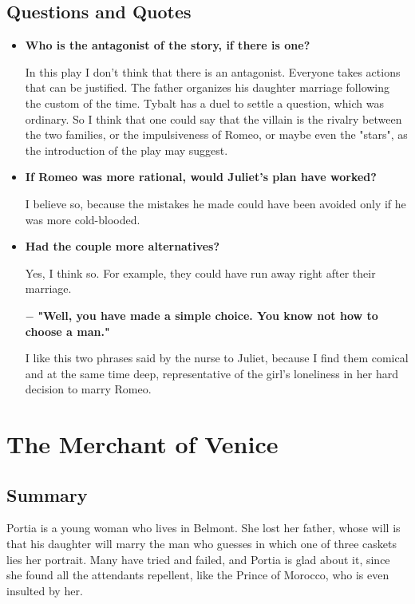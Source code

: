 \documentclass[]{article}
\begin{document}
\subsection*{Questions and Quotes}
\begin{itemize}
    \item \textbf{Who is the antagonist of the story, if there is one?} \par
        In this play I don't think that there is an antagonist. Everyone takes actions that can be justified. The father organizes his daughter marriage following the custom of the time. Tybalt has a duel to settle a question, which was ordinary. So I think that one could say that the villain is the rivalry between the two families, or the impulsiveness of Romeo, or maybe even the "stars", as the introduction of the play may suggest.
    \item \textbf{If Romeo was more rational, would Juliet's plan have worked?} \par
        I believe so, because the mistakes he made could have been avoided only if he was more cold-blooded.
    \item \textbf{Had the couple more alternatives?} \par
        Yes, I think so. For example, they could have run away right after their marriage.

    \item[$-$] \textbf{"Well, you have made a simple choice. You know not how to choose a man."} \par
        I like this two phrases said by the nurse to Juliet, because I find them comical and at the same time deep, representative of the girl's loneliness in her hard decision to marry Romeo.
\end{itemize}


\newpage
\section{The Merchant of Venice}
\subsection*{Summary}
\hspace{1em}
Portia is a young woman who lives in Belmont. She lost her father, whose will is that his daughter will marry the man who guesses in which one of three caskets lies her portrait. Many have tried and failed, and Portia is glad about it, since she found all the attendants repellent, like the Prince of Morocco, who is even insulted by her.
\end{document}

